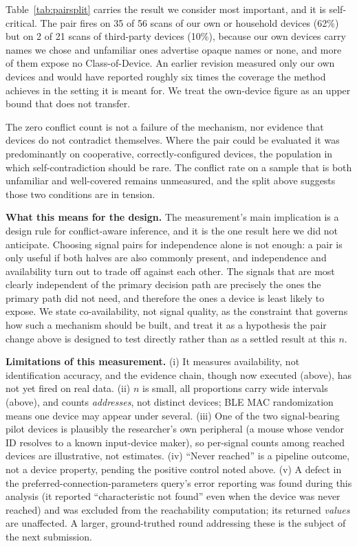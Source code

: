 \documentclass[conference]{IEEEtran}
\begin{document}
Table~\ref{tab:pairsplit} carries the result we consider most important, and
it is self-critical. The pair fires on 35 of 56 scans of our own or household
devices (62\%) but on 2 of 21 scans of third-party devices (10\%), because
our own devices carry names we chose and unfamiliar ones advertise opaque
names or none, and more of them expose no Class-of-Device. An earlier
revision measured only our own devices and would have reported roughly six
times the coverage the method achieves in the setting it is meant for. We
treat the own-device figure as an upper bound that does not transfer.

The zero conflict count is not a failure of the mechanism, nor evidence that
devices do not contradict themselves. Where the pair could be evaluated it
was predominantly on cooperative, correctly-configured devices, the
population in which self-contradiction should be rare. The conflict rate on a
sample that is both unfamiliar and well-covered remains unmeasured, and the
split above suggests those two conditions are in tension.

\textbf{What this means for the design.} The measurement's main implication
is a design rule for conflict-aware inference, and it is the one result here
we did not anticipate. Choosing signal pairs for independence alone is not
enough: a pair is only useful if both halves are also commonly present, and
independence and availability turn out to trade off against each other. The
signals that are most clearly independent of the primary decision path are
precisely the ones the primary path did not need, and therefore the ones a
device is least likely to expose. We state co-availability, not signal
quality, as the constraint that governs how such a mechanism should be built,
and treat it as a hypothesis the pair change above is designed to test
directly rather than as a settled result at this $n$.

\textbf{Limitations of this measurement.} (i) It measures availability,
not identification accuracy, and the evidence chain, though now executed
(above), has not yet fired on real data. (ii) $n$ is small, all proportions carry wide intervals
(above), and counts \emph{addresses}, not distinct devices; BLE MAC
randomization means one device may appear under several. (iii) One of
the two signal-bearing pilot devices is plausibly the researcher's own
peripheral (a mouse whose vendor ID resolves to a known input-device
maker), so per-signal counts among reached devices are illustrative, not
estimates. (iv) ``Never reached'' is a pipeline outcome, not a device
property, pending the positive control noted above. (v) A defect in the
preferred-connection-parameters query's error reporting was found during
this analysis (it reported ``characteristic not found'' even when the
device was never reached) and was excluded from the reachability
computation; its returned \emph{values} are unaffected. A larger,
ground-truthed round addressing these is the subject of the next
submission.
\end{document}
